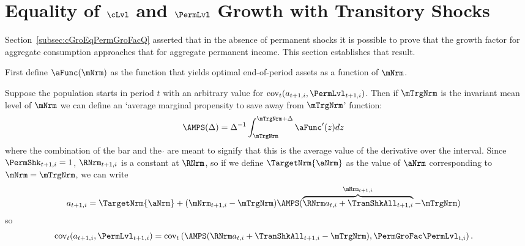 \documentclass[\econtexRoot/BufferStockTheory]{subfiles}
\begin{document}
\section{Equality of \texorpdfstring{$\cLvl$}{} and \texorpdfstring{$\PermLvl$}{p} Growth with Transitory Shocks}\label{sec:ApndxCGroIsPermGroFac}

Section~\ref{subsec:cGroEqPermGroFacQ} asserted that in the absence of permanent shocks it is possible to prove that the growth factor for aggregate consumption approaches that for aggregate permanent income.  This section establishes that result.

First define $\aFunc(\mNrm)$ as the function that yields optimal end-of-period assets as a function of $\mNrm$.

Suppose the population starts in period $t$ with an arbitrary value for
 $\mbox{cov}_{t}(a_{t+1,i},\PermLvl_{t+1,i})$. 
 Then if $\mTrgNrm$ is the invariant mean level of $\mNrm$ we can define an `average marginal propensity to save away from $\mTrgNrm$' function:
\begin{equation}\begin{gathered}\begin{aligned}
 \AMPS(\Delta)  & =  \Delta^{-1}\int_{\mTrgNrm}^{\mTrgNrm+\Delta} \aFunc^{\prime}(z)
 dz \label{eq:checkaFunc} \nonumber
\end{aligned}\end{gathered}\end{equation}
where the combination of the bar and the $\acute{}$ are meant to signify that this is the average value of the derivative over the interval.
Since $\PermShk_{t+1,i}=1$, $\RNrm_{t+1,i}$ is a constant at $\RNrm$, so if we define $\TargetNrm{\aNrm}$ as the value of $\aNrm$ corresponding to $\mNrm = \mTrgNrm$, we can write
\begin{equation}\begin{gathered}\begin{aligned}
  a_{t+1,i} 
& =   \TargetNrm{\aNrm}+(\mNrm_{t+1,i}-\mTrgNrm)\AMPS(\overbrace{\RNrm
    a_{t,i}+\TranShkAll_{t+1,i}}^{\mNrm_{t+1,i}}-\mTrgNrm) \nonumber
\end{aligned}\end{gathered}\end{equation}
so
\begin{equation}\begin{gathered}\begin{aligned}
\mbox{cov}_{t}(a_{t+1,i},\PermLvl_{t+1,i})
 & = \mbox{cov}_{t}\left(\AMPS(\RNrm  a_{t,i}+\TranShkAll_{t+1,i}-\mTrgNrm)
  ,\PermGroFac   \PermLvl_{t,i}\right). \nonumber
\end{aligned}\end{gathered}\end{equation}
\end{document}
